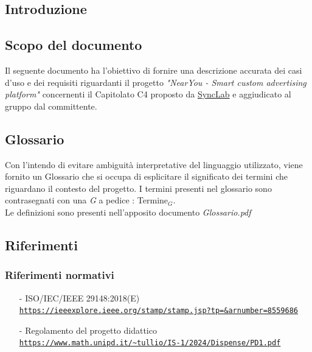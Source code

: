 \documentclass[11pt]{article}
\begin{document}
\newpage
\begin{justify}
    

\section{Introduzione}
\label{sec:intro}

\subsection{Scopo del documento}

Il seguente documento ha l'obiettivo di fornire una descrizione accurata dei casi d'uso e dei requisiti riguardanti il progetto \textit{"NearYou - 
Smart custom advertising platform"} concernenti il Capitolato C4 proposto da \href{https://www.synclab.it/home}{SyncLab} e aggiudicato al gruppo dal committente.


\subsection{Glossario}
Con l'intendo di evitare ambiguità interpretative del linguaggio utilizzato, viene fornito un Glossario che si occupa di esplicitare il significato dei termini che riguardano il contesto del progetto. I termini presenti nel glossario sono contrasegnati con una \textit{G} a pedice : Termine\(_G\).\\
Le definizioni sono presenti nell'apposito documento \textit{Glossario.pdf}


\subsection{Riferimenti}


\subsubsection{Riferimenti normativi}
\begin{itemize}
    \item[-] ISO/IEC/IEEE 29148:2018(E) \\
    \textcolor{blue}{\texttt{\url{https://ieeexplore.ieee.org/stamp/stamp.jsp?tp=&arnumber=8559686}}}
    
    \item[-] Regolamento del progetto didattico  \\
    \textcolor{blue}{\texttt{\url{https://www.math.unipd.it/~tullio/IS-1/2024/Dispense/PD1.pdf}}}
    

\end{itemize}
\end{justify}
\end{document}
